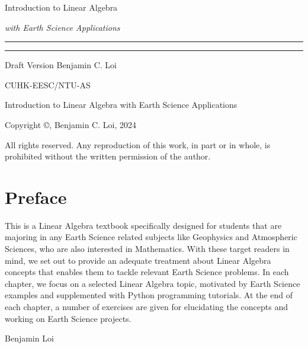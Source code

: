 \begin{titlepage}
    {\Huge\raggedright Introduction to Linear Algebra \par}
    {\Large\raggedright \textit{with Earth Science Applications} \hfill\textcolor{Mahogany}{\rule{3mm}{3mm}} \par}
    \vspace{3mm}\hrule\par
    {\Large\raggedleft Draft Version \hfill Benjamin C. Loi \par}
    \vfill
    {\Large\raggedleft CUHK-EESC/NTU-AS \par}
\end{titlepage}
\begin{titlepage}
\begin{center}
Introduction to Linear Algebra with Earth Science Applications

Copyright ©, Benjamin C. Loi, 2024 

All rights reserved. Any reproduction of this work, in part or in whole, is prohibited without the written permission of the author.
\end{center}
\end{titlepage}
\newpage


\chapter*{Preface}
This is a Linear Algebra textbook specifically designed for students that are majoring in any Earth Science related subjects like Geophysics and Atmospheric Sciences, who are also interested in Mathematics. With these target readers in mind, we set out to provide an adequate treatment about Linear Algebra concepts that enables them to tackle relevant Earth Science problems. In each chapter, we focus on a selected Linear Algebra topic, motivated by Earth Science examples and supplemented with Python programming tutorials. At the end of each chapter, a number of exercises are given for elucidating the concepts and working on Earth Science projects. \par
{\raggedleft Benjamin Loi \par}

\tableofcontents